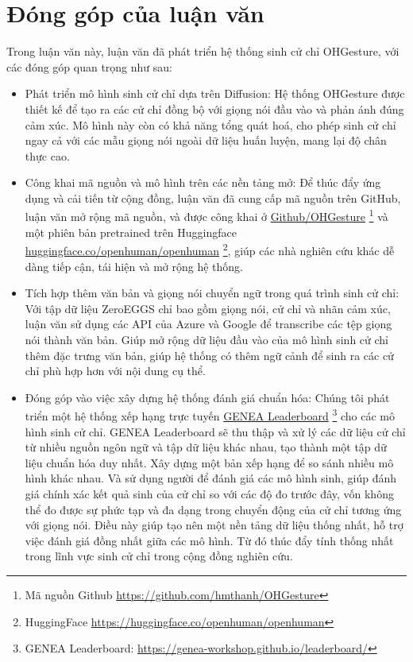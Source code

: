 


\section{Đóng góp của luận văn}

Trong luận văn này, luận văn đã phát triển hệ thống sinh cử chỉ OHGesture, với các đóng góp quan trọng như sau:

\begin{itemize}
	\item Phát triển mô hình sinh cử chỉ dựa trên Diffusion: Hệ thống OHGesture được thiết kế để tạo ra các cử chỉ đồng bộ với giọng nói đầu vào và phản ánh đúng cảm xúc. Mô hình này còn có khả năng tổng quát hoá, cho phép sinh cử chỉ ngay cả với các mẫu giọng nói ngoài dữ liệu huấn luyện, mang lại độ chân thực cao.
	
	\item Công khai mã nguồn và mô hình trên các nền tảng mở: Để thúc đẩy ứng dụng và cải tiến từ cộng đồng, luận văn đã cung cấp mã nguồn trên GitHub, luận văn mở rộng mã nguồn, và được công khai ở \hyperlink{https://github.com/hmthanh/OHGesture}{Github/OHGesture} \footnote{Mã nguồn Github \url{https://github.com/hmthanh/OHGesture}} và một phiên bản pretrained trên Huggingface \hyperlink{https://huggingface.co/openhuman/openhuman}{huggingface.co/openhuman/openhuman} \footnote{HuggingFace \url{https://huggingface.co/openhuman/openhuman}}, giúp các nhà nghiên cứu khác dễ dàng tiếp cận, tái hiện và mở rộng hệ thống.
	
	\item Tích hợp thêm văn bản và giọng nói chuyển ngữ trong quá trình sinh cử chỉ: Với tập dữ liệu ZeroEGGS chỉ bao gồm giọng nói, cử chỉ và nhãn cảm xúc, luận văn sử dụng các API của Azure và Google để transcribe các tệp giọng nói thành văn bản. Giúp mở rộng dữ liệu đầu vào của mô hình sinh cử chỉ thêm đặc trưng văn bản, giúp hệ thống có thêm ngữ cảnh để sinh ra các cử chỉ phù hợp hơn với nội dung cụ thể.
	
	\item Đóng góp vào việc xây dựng hệ thống đánh giá chuẩn hóa: Chúng tôi phát triển một hệ thống xếp hạng trực tuyến \hyperlink{https://genea-workshop.github.io/leaderboard/}{GENEA Leaderboard} \footnote{GENEA Leaderboard: \url{https://genea-workshop.github.io/leaderboard/}} \cite{nagy2024towards} cho các mô hình sinh cử chỉ. GENEA Leaderboard sẽ thu thập và xử lý các dữ liệu cử chỉ từ nhiều nguồn ngôn ngữ và tập dữ liệu khác nhau, tạo thành một tập dữ liệu chuẩn hóa duy nhất. Xây dựng một bản xếp hạng để so sánh nhiều mô hình khác nhau. Và sử dụng người để đánh giá các mô hình sinh, giúp đánh giá chính xác kết quả sinh của cử chỉ so với các độ đo trước đây, vốn không thể đo được sự phức tạp và đa dạng trong chuyển động của cử chỉ tương ứng với giọng nói. Điều này giúp tạo nên một nền tảng dữ liệu thống nhất, hỗ trợ việc đánh giá đồng nhất giữa các mô hình. Từ đó thúc đẩy tính thống nhất trong lĩnh vực sinh cử chỉ trong cộng đồng nghiên cứu.
	

\end{itemize}
